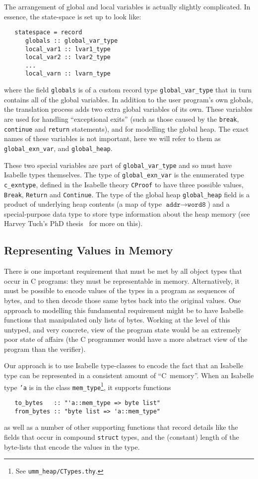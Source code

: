 \documentclass{article}
\newcommand{\globexnvar}{\texttt{global\_exn\_var}}
\newcommand{\globheap}{\texttt{global\_heap}}
\begin{document}
The arrangement of global and local variables is actually slightly
complicated.  In essence, the state-space is set up to look like:
\begin{verbatim}
   statespace = record
      globals :: global_var_type
      local_var1 :: lvar1_type
      local_var2 :: lvar2_type
      ...
      local_varn :: lvarn_type
\end{verbatim}
where the field \texttt{globals} is of a custom record type
\texttt{global_var_type} that in turn contains all of the global
variables.  In addition to the user program's own globals, the
translation process adds two extra global variables of its own.  These
variables are used for handling ``exceptional exits'' (such as those
caused by the \texttt{break}, \texttt{continue} and \texttt{return}
statements), and for modelling the global heap.  The exact names of
these variables is not important, here we will refer to them as
\globexnvar, and \globheap.

These two special variables are part of \texttt{global_var_type} and
so must have Isabelle types themselves.  The type of \globexnvar{} is
the enumerated type \texttt{c_exntype}, defined in the Isabelle
theory \texttt{CProof} to have three possible values, \texttt{Break},
\texttt{Return} and \texttt{Continue}.  The type of the global heap
\globheap{} field is a product of underlying heap contents (a map of
type $\texttt{addr}\rightarrow\texttt{word8}$) and a special-purpose
data type to store type information about the heap memory (see Harvey
Tuch's PhD thesis~\cite{Tuch:phd} for more on this).

\subsection{Representing Values in Memory}
There is one important requirement that must be met by all object
types that occur in C programs: they must be representable in memory.
Alternatively, it must be possible to encode values of the types in a
program as sequences of bytes, and to then decode those same bytes
back into the original values.  One approach to modelling this
fundamental requirement might be to have Isabelle functions that
manipulated only lists of bytes.  Working at the level of this
untyped, and very concrete, view of the program state would be an
extremely poor state of affairs (the C programmer would have a more
abstract view of the program than the verifier).

Our approach is to use Isabelle type-classes to encode the fact that
an Isabelle type can be represented in a consistent amount of
``C~memory''.  When an Isabelle type \texttt{'a} is in the class
\texttt{mem_type}\footnote{See \texttt{umm_heap/CTypes.thy}.}, it
supports functions
\begin{verbatim}
   to_bytes   :: "'a::mem_type => byte list"
   from_bytes :: "byte list => 'a::mem_type"
\end{verbatim}
as well as a number of other supporting functions that record details
like the fields that occur in compound \texttt{struct} types, and the
(constant) length of the byte-lists that encode the values in the
type.
\end{document}
